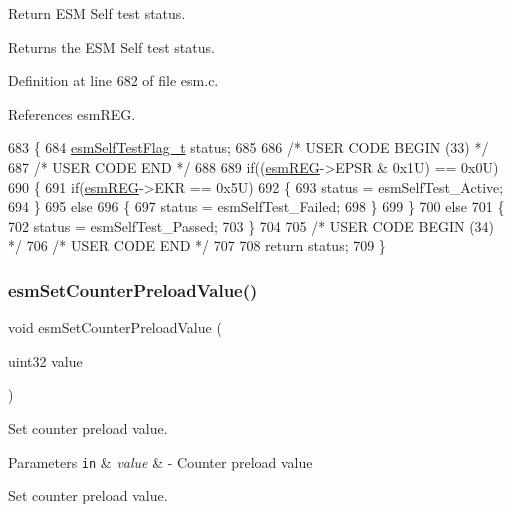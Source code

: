 Return E\+SM Self test status. 

Returns the E\+SM Self test status. 

Definition at line 682 of file esm.\+c.



References esm\+R\+EG.


\begin{DoxyCode}
683 \{
684     \mbox{\hyperlink{esm_8h_a622c861bffa9a22dacbc62fe8a2ff11f}{esmSelfTestFlag\_t}} status;
685 
686 \textcolor{comment}{/* USER CODE BEGIN (33) */}
687 \textcolor{comment}{/* USER CODE END */}
688 
689     \textcolor{keywordflow}{if}((\mbox{\hyperlink{reg__esm_8h_a7c2e779f2973e0c2c9496a4796df10f1}{esmREG}}->EPSR & 0x1U) == 0x0U) 
690     \{
691       \textcolor{keywordflow}{if}(\mbox{\hyperlink{reg__esm_8h_a7c2e779f2973e0c2c9496a4796df10f1}{esmREG}}->EKR == 0x5U)
692       \{ 
693         status = esmSelfTest\_Active;
694       \}
695       \textcolor{keywordflow}{else}
696       \{
697         status = esmSelfTest\_Failed;
698       \}
699     \}
700     \textcolor{keywordflow}{else}
701     \{
702         status = esmSelfTest\_Passed;
703     \}
704 
705 \textcolor{comment}{/* USER CODE BEGIN (34) */}
706 \textcolor{comment}{/* USER CODE END */}
707 
708     \textcolor{keywordflow}{return} status;
709 \}
\end{DoxyCode}
\mbox{\label{group__ESM_gac0c9d63eb56fc294c3845f53685ecf36}} 
\subsubsection{\texorpdfstring{esm\+Set\+Counter\+Preload\+Value()}{esmSetCounterPreloadValue()}}
{\footnotesize\ttfamily void esm\+Set\+Counter\+Preload\+Value (\begin{DoxyParamCaption}\item[{uint32}]{value }\end{DoxyParamCaption})}



Set counter preload value. 


\begin{DoxyParams}[1]{Parameters}
\mbox{\tt in}  & {\em value} & -\/ Counter preload value\\
\hline
\end{DoxyParams}
Set counter preload value. 


